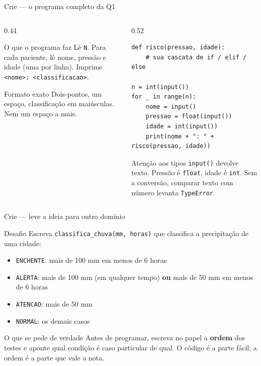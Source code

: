 \documentclass[aspectratio=169]{beamer}
\newcommand{\code}[1]{\texttt{\small #1}}
\begin{document}
\begin{frame}[fragile,shrink=6]{Crie --- o programa completo da Q1}
  \begin{columns}[T]
    \begin{column}{0.44\textwidth}
      \begin{block}{O que o programa faz}
        {\small Lê \code{N}. Para cada paciente, lê nome, pressão e
        idade (uma por linha). Imprime \code{<nome>: <classificacao>}.}
      \end{block}
      \begin{alertblock}{Formato exato}
        {\small Dois-pontos, um espaço, classificação em maiúsculas.
        Nem um espaço a mais.}
      \end{alertblock}
    \end{column}
    \begin{column}{0.52\textwidth}
\begin{lstlisting}
def risco(pressao, idade):
    # sua cascata de if / elif / else

n = int(input())
for _ in range(n):
    nome = input()
    pressao = float(input())
    idade = int(input())
    print(nome + ": " + risco(pressao, idade))
\end{lstlisting}
      \begin{exampleblock}{Atenção aos tipos}
        {\small \code{input()} devolve texto. Pressão é \code{float},
        idade é \code{int}. Sem a conversão, comparar texto com número
        levanta \code{TypeError}.}
      \end{exampleblock}
    \end{column}
  \end{columns}
\end{frame}

\begin{frame}[shrink=4]{Crie --- leve a ideia para outro domínio}
  \begin{block}{Desafio}
    \small
    Escreva \code{classifica\_chuva(mm, horas)} que classifica a
    precipitação de uma cidade:
    \begin{itemize}
      \item \code{ENCHENTE}: mais de 100 mm em menos de 6 horas
      \item \code{ALERTA}: mais de 100 mm (em qualquer tempo)
            \textbf{ou} mais de 50 mm em menos de 6 horas
      \item \code{ATENCAO}: mais de 50 mm
      \item \code{NORMAL}: os demais casos
    \end{itemize}
  \end{block}

  \vspace{0.15cm}
  \begin{exampleblock}{O que se pede de verdade}
    {\small Antes de programar, escreva no papel a \textbf{ordem} dos
    testes e aponte qual condição é caso particular de qual. O código
    é a parte fácil; a ordem é a parte que vale a nota.}
  \end{exampleblock}
\end{frame}
\end{document}
